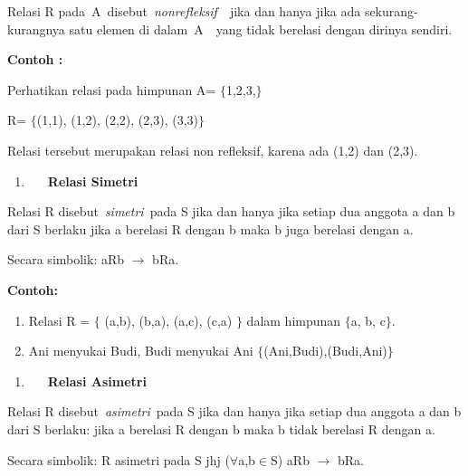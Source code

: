 \documentclass[11pt,fleqn]{book} %
\begin{document}
\begin{myEnumerate}
\begin{itemize}
\noindent 

\noindent Relasi R pada~A~disebut~\textit{nonrefleksif}~~jika dan hanya jika ada sekurang-kurangnya satu elemen di dalam~A~~yang tidak berelasi dengan dirinya sendiri.

\noindent 

\noindent \textbf{Contoh :}

\noindent \textbf{}

\noindent Perhatikan relasi pada himpunan A= $\{$1,2,3,$\}$

\noindent R= $\{$(1,1), (1,2), (2,2), (2,3), (3,3)$\}$

\noindent Relasi tersebut merupakan relasi non refleksif, karena ada (1,2) dan (2,3).

\noindent 

\noindent 

\begin{enumerate}
\item  ~~~\textbf{Relasi Simetri}
\end{enumerate}

\noindent 

\noindent Relasi R disebut~\textit{simetri}~pada S jika dan hanya jika setiap dua anggota a dan b dari S berlaku jika a berelasi R dengan b maka b juga berelasi dengan a. 

\noindent Secara simbolik: aRb $\mathrm{\to}$ bRa.

\noindent 

\noindent \textbf{Contoh:}

\begin{enumerate}
\item \textbf{ }Relasi R = $\{$ (a,b), (b,a), (a,c), (c,a) $\}$ dalam himpunan $\{$a, b, c$\}$.

\item  Ani menyukai Budi, Budi menyukai Ani $\{$(Ani,Budi),(Budi,Ani)$\}$
\end{enumerate}

\noindent 

\begin{enumerate}
\item  ~~~\textbf{Relasi Asimetri}
\end{enumerate}

\noindent \textbf{}

\noindent Relasi R disebut~\textit{asimetri}~pada S jika dan hanya jika setiap dua anggota a dan b dari S berlaku: jika a berelasi R dengan b maka b tidak berelasi R dengan a.

\noindent Secara simbolik: R asimetri pada S jhj ($\mathrm{\forall }$a,b$\mathrm{\in }$S) aRb $\mathrm{\to}$ bRa.


\end{itemize}
\end{myEnumerate}
\end{document}
